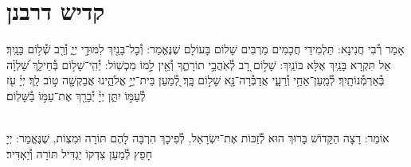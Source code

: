\documentclass[twoside, openany, parskip=half, 11pt]{book}
\begin{document}
\tachanunim

\vfill


\sepline


\chapter[קדיש דרבנן]{ קדיש דרבנן }
\label{kaddish derabonan}


אָמַר רְ֯בִי חֲנִינָא: תַּלְמִידֵי חֲכָמִים מַרְבִּים שָׁלוֹם בָּעוֹלָם שֶׁנֶּאֱמַר: וְ֯כׇל־בָּנַ֖יִךְ לִמּוּדֵ֣י יְיָ֑ וְ֯רַ֖ב שְׁ֯ל֥וֹם בָּנָֽיִךְ׃ אַל תִּקְרָא בָּנַֽיִךְ אֶלָּא בּוֹנַֽיִךְ: שָׁל֣וֹם רָ֭ב לְ֯אֹֽהֲבֵ֣י תוֹרָתֶ֑ךָ וְ֯אֵ֖ין לָ֣מוֹ מִכְשֽׁוֹל: יְ֯הִֽי־שָׁל֥וֹם בְּ֯חֵילֵ֑ךְ שַׁ֝לְוָ֗ה בְּ֯אַרְמְ֯נוֹתָֽיִךְ׃ לְ֯מַֽעַן־אַחַ֥י וְ֯רֵעָ֑י אֲדַבְּ֯רָה־נָּ֖א שָׁל֣וֹם בָּֽךְ׃ לְ֭֯מַעַן בֵּית־יְיָ֣ אֱלֹהֵ֑ינוּ אֲבַקְשָׁ֖ה ט֣וֹב לָֽךְ׃ יְיָ֗ עֹ֖ז לְ֯עַמּ֣וֹ יִתֵּ֑ן יְיָ֓ יְ֯בָרֵ֖ךְ אֶת־עַמּ֣וֹ בַ֯שָּׁלֽוֹם׃

\\
אוֹמֵר: רָצָה הַקָּדוֹשׁ בָּרוּךְ הוּא לְ֯זַכּוֹת אֶת־יִשְׂרָאֵל, לְ֯פִיכָךְ הִרְבָּה לָהֶם תּוֹרָה וּמִצְוֹת, שֶׁנֶּאֱמַר:
יְיָ חָפֵץ לְ֯מַעַן צִדְקוֹ יַגְדִּיל תּוֹרָה וְ֯יַאְדִּיר׃


\begin{kaddish}

\rabbiskaddish
\end{kaddish}

\vfill
{}\quad{}\quad{}
\end{document}
